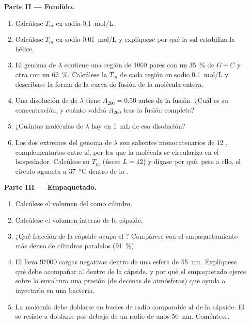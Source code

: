 \begin{problem}
\medskip
\noindent\textbf{Parte II --- Fundido.}
\begin{enumerate}[resume]
  \item Calcúlese $T_m$ en sodio \qty{0.1}{mol/L}.
  \item Calcúlese $T_m$ en sodio \qty{0.01}{mol/L} y explíquese por qué la
        sal estabiliza la hélice.
  \item El genoma de $\lambda$ contiene una región de \qty{1000}{} pares
        con un \qty{35}{\%} de $G + C$ y otra con un \qty{62}{\%}.
        Calcúlese la $T_m$ de cada región en sodio \qty{0.1}{mol/L} y
        descríbase la forma de la curva de fusión de la molécula entera.
  \item Una disolución de  de $\lambda$ tiene $A_{260} = 0.50$ antes de
        la fusión. ¿Cuál es su concentración, y cuánto valdrá $A_{260}$
        tras la fusión completa?
  \item ¿Cuántas moléculas de $\lambda$ hay en \qty{1}{mL} de esa
        disolución?
  \item Los dos extremos del genoma de $\lambda$ son salientes
        monocatenarios de 12 , complementarios entre sí, por los
        que la molécula se circulariza en el hospedador. Calcúlese su
        $T_m$ (úsese $L = 12$) y dígase por qué, pese a ello, el círculo
        aguanta a \qty{37}{\celsius} dentro de la .
\end{enumerate}

\medskip
\noindent\textbf{Parte III --- Empaquetado.}
\begin{enumerate}[resume]
  \item Calcúlese el volumen del  como cilindro.
  \item Calcúlese el volumen interno de la cápside.
  \item ¿Qué fracción de la cápside ocupa el ? Compárese con el
        empaquetamiento más denso de cilindros paralelos (\qty{91}{\%}).
  \item El  lleva \num{97000} cargas negativas dentro de una esfera de
        \qty{55}{nm}. Explíquese qué debe acompañar al  dentro de la
        cápside, y por qué el  empaquetado ejerce sobre la envoltura
        una presión (de decenas de atmósferas) que ayuda a inyectarlo en
        una bacteria.
  \item La molécula debe doblarse en bucles de radio comparable al de la
        cápside. El  se resiste a doblarse por debajo de un radio de
        unos \qty{50}{nm}. Coméntese.
\end{enumerate}


\end{problem}
